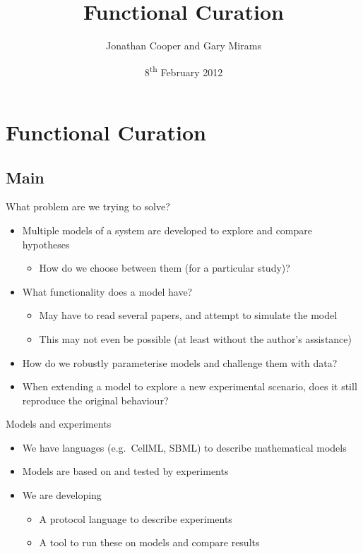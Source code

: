 \documentclass[t,xcolor={usenames,dvipsnames}]{beamer}
\title[Functional Curation]{Functional Curation}
\author{Jonathan Cooper and Gary Mirams}
\institute[Computational Biology]
{Computational Biology Group\\
 Department of Computer Science\\
 University of Oxford}
\date{8\textsuperscript{th} February 2012}
\begin{document}
\begin{frame}
\titlepage
\end{frame}
\section{Functional Curation}
\subsection*{Main}


\begin{frame}{What problem are we trying to solve?}
\begin{itemize}
\item Multiple models of a system are developed to explore and compare hypotheses
  \begin{itemize}
  \item How do we choose between them (for a particular study)?
  \end{itemize}
\item What functionality does a model have?
  \begin{itemize}
  \item May have to read several papers, and attempt to simulate the model
  \item This may not even be possible (at least without the author's assistance)
  \end{itemize}
\item How do we robustly parameterise models and challenge them with data?
\item When extending a model to explore a new experimental scenario, does it still reproduce the original behaviour?
\end{itemize}
\end{frame}

\begin{frame}{Models and experiments}
\begin{itemize}
\item We have languages (e.g.\ CellML, SBML) to describe mathematical models
\item Models are based on and tested by \alert{experiments}
\item We are developing
  \begin{itemize}
  \item A \alert{protocol language} to describe experiments %
  \item A tool to run these on models and compare results
  \end{itemize}
\end{itemize}
\end{frame}
\end{document}
